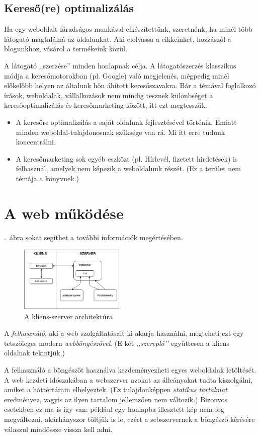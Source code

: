 \documentclass[12pt,twoside]{report}
\theoremstyle{definition}
\begin{document}
	\subsection{Kereső(re) optimalizálás}
	Ha egy weboldalt fáradságos munkával elkészítettünk, szeretnénk, ha minél több látogató magtalálná az oldalunkat. Aki elolvassa a cikkeinket, hozzászól a blogunkhoz, vásárol a termékeink közül.
	
	A látogató ,,szerzése'' minden honlapnak célja. A látogatószerzés klasszikus módja a keresőmotorokban (pl. Google) való megjelenés, mégpedig minél előkelőbb helyen az általunk hőn áhított keresőszavakra. Bár a témával foglalkozó írások, weboldalak, vállalkozások nem mindig tesznek különbséget a keresőoptimalizálás és keresőmarketing között, itt ezt megtesszük.
	\begin{itemize}
		\item A keresőre optimalizálás a saját oldalunk fejlesztésével történik. Emiatt minden weboldal-tulajdonosnak szüksége van rá. Mi itt erre tudunk koncentrálni.
		\item A keresőmarketing sok egyéb eszközt (pl. Hírlevél, fizetett hirdetések) is felhasznál, amelyek nem képezik a weboldalunk részét. (Ez a terület nem témája a könyvnek.)
	\end{itemize}
\section{A web működése}
\Az{\ref{fig:kliensszerver}}.~ábra sokat segíthet a további információk megértésében.
\begin{figure}[th!]
	\centering
	\includegraphics[width=5cm]{kliensszerver}
	\caption{A kliens-szerver architektúra}
	\label{fig:kliensszerver}
\end{figure}

A  \emph{felhasználó}, aki a web szolgáltatásait ki akarja használni, megteheti ezt egy tetszőleges modern \emph{webböngészővel}. (E két  \emph{,,szereplő’'} együttesen a kliens oldalnak tekintjük.)

A felhasználó a böngészőt használva kezdeményezheti egyes weboldalak letöltését. A web kezdeti időszakában a webszerver azokat az álleányokat tudta kiszolgálni, amiket a háttértárain elhelyeztek. (Ez tulajdonképpen \emph{statikus tartalmat} eredményez, vagyis az ilyen tartalom jellemzően nem változik.) Bizonyos esetekben ez ma is így van: például egy honlapba illesztett kép nem fog megváltozni, akárhányszor töltjük is le, ezért a sebszervernek a böngésző kérésére válaszul mindössze vissza kell adni.
\end{document}
